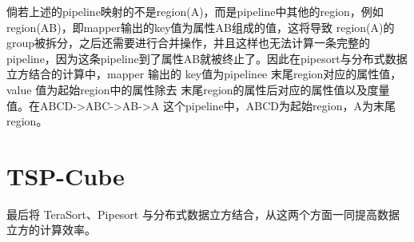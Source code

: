 倘若上述的pipeline映射的不是region(A)，而是pipeline中其他的region，例如region(AB)，即mapper输出的key值为属性AB组成的值，这将导致 region(A)的group被拆分，之后还需要进行合并操作，并且这样也无法计算一条完整的pipeline，因为这条pipeline到了属性AB就被终止了。因此在pipesort与分布式数据立方结合的计算中，mapper 输出的 key值为pipelinee 末尾region对应的属性值，value 值为起始region中的属性除去 末尾region的属性后对应的属性值以及度量值。在ABCD-\textgreater ABC-\textgreater AB-\textgreater A 这个pipeline中，ABCD为起始region，A为末尾region。


\section{TSP-Cube}

最后将 TeraSort、Pipesort 与分布式数据立方结合，从这两个方面一同提高数据立方的计算效率。






